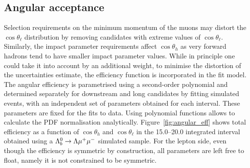 \subsection{Angular acceptance}
\label{sec:AngEff}

Selection requirements on the minimum momentum of the muons may distort the $\cos\theta_\ell$ 
distribution by removing candidates with extreme values of $\cos\theta_\ell$. Similarly, 
the impact parameter requirements affect $\cos\theta_h$ as very forward hadrons tend
to have smaller impact parameter values. While in principle one could take it into account
by an additional weight, to minimise the distortion of the uncertainties estimate,
the efficiency function is incorporated in the fit model. The angular efficiency is
parametrised using a second-order polynomial and determined separately for downstream and
long candidates by fitting simulated events, with an independent set of parameters obtained
for each \qsq interval. These parameters are fixed for the fits to data.
Using polynomial functions allows to calculate the PDF normalisation analytically.
Figure~\ref{fig:angular_eff} shows total efficiency as a function of $\cos\theta_h$ and 
$\cos\theta_\ell$ in the 15.0--20.0 integrated \qsq interval obtained using a $\Lambda^0_b\rightarrow\Lambda\mu^+\mu^-$ simulated sample.
%
For the lepton side, even though the efficiency is symmetric by construction,
all parameters are left free to float, namely it is not constrained to be symmetric.


